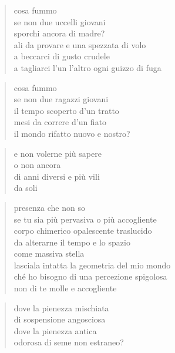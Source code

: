 	\begin{verse}
		cosa fummo\\
		se non due uccelli giovani\\
		sporchi ancora di madre?\\
		ali da provare e una spezzata di volo\\
		a beccarci di gusto crudele\\
		a tagliarci l'un l'altro ogni guizzo di fuga
	\end{verse}

	\begin{verse}
		cosa fummo\\
		se non due ragazzi giovani\\
		il tempo scoperto d'un tratto\\
		mesi da correre d'un fiato\\
		il mondo rifatto nuovo e nostro?
	\end{verse}
	
	\begin{verse}
		e non volerne più sapere\\
		o non ancora\\
		di anni diversi e più vili\\
		da soli
	\end{verse}

\clearpage


\vspace*{2cm}

	\begin{verse}
		presenza che non so\\
		se tu sia più pervasiva o più accogliente\\
		corpo chimerico opalescente traslucido\\
		da alterarne il tempo e lo spazio\\
		come massiva stella\\
		lasciala intatta la geometria del mio mondo\\
		ché ho bisogno di una percezione spigolosa\\
		non di te molle e accogliente
	\end{verse}

\clearpage


\vspace*{2cm}

	\begin{verse}
		dove la pienezza mischiata\\
		di sospensione angosciosa\\
		dove la pienezza antica\\
		odorosa di seme non estraneo?
	\end{verse}

